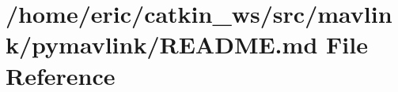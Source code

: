 \hypertarget{mavlink_2pymavlink_2README_8md}{}\section{/home/eric/catkin\+\_\+ws/src/mavlink/pymavlink/\+R\+E\+A\+D\+ME.md File Reference}
\label{mavlink_2pymavlink_2README_8md}
